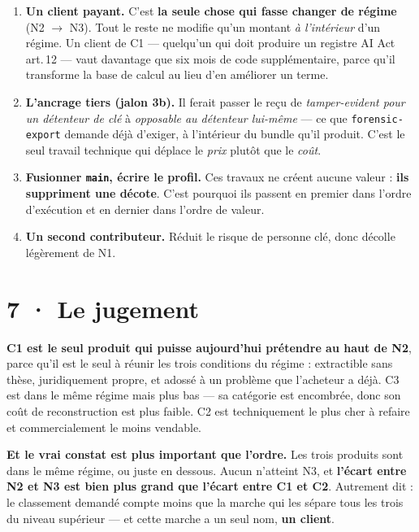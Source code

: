 \documentclass[10pt]{article}
\newcommand{\code}[1]{\texttt{\small #1}}
\begin{document}
\begin{enumerate}[leftmargin=1.6em,itemsep=3pt,topsep=3pt]
\item \textbf{Un client payant.} C'est \textbf{la seule chose qui fasse changer de régime} (N2
      $\rightarrow$ N3). Tout le reste ne modifie qu'un montant \emph{à l'intérieur} d'un régime. Un
      client de C1 --- quelqu'un qui doit produire un registre AI Act art.\,12 --- vaut davantage que six
      mois de code supplémentaire, parce qu'il transforme la base de calcul au lieu d'en améliorer un
      terme.
\item \textbf{L'ancrage tiers (jalon 3b).} Il ferait passer le reçu de \emph{tamper-evident pour un
      détenteur de clé} à \emph{opposable au détenteur lui-même} --- ce que \code{forensic-export}
      demande déjà d'exiger, à l'intérieur du bundle qu'il produit. C'est le seul travail technique qui
      déplace le \emph{prix} plutôt que le \emph{coût}.
\item \textbf{Fusionner \code{main}, écrire le profil.} Ces travaux ne créent aucune valeur :
      \textbf{ils suppriment une décote}. C'est pourquoi ils passent en premier dans l'ordre d'exécution
      et en dernier dans l'ordre de valeur.
\item \textbf{Un second contributeur.} Réduit le risque de personne clé, donc décolle légèrement de N1.
\end{enumerate}

\section{7 · Le jugement}

\textbf{C1 est le seul produit qui puisse aujourd'hui prétendre au haut de N2}, parce qu'il est le seul
à réunir les trois conditions du régime : extractible sans thèse, juridiquement propre, et adossé à un
problème que l'acheteur a déjà. C3 est dans le même régime mais plus bas --- sa catégorie est
encombrée, donc son coût de reconstruction est plus faible. C2 est techniquement le plus cher à refaire
et commercialement le moins vendable.

\begin{piste}
\textbf{Et le vrai constat est plus important que l'ordre.} Les trois produits sont dans le même
régime, ou juste en dessous. Aucun n'atteint N3, et \textbf{l'écart entre N2 et N3 est bien plus grand
que l'écart entre C1 et C2}. Autrement dit : le classement demandé compte moins que la marche qui les
sépare tous les trois du niveau supérieur --- et cette marche a un seul nom, \textbf{un client}.
\end{piste}
\end{document}
